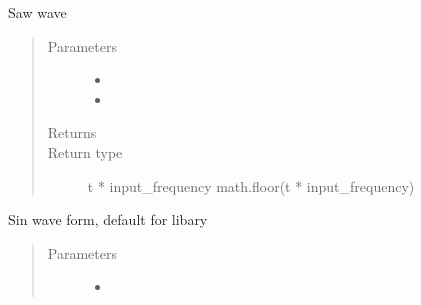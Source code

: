 \documentclass[letterpaper,10pt,english]{sphinxmanual}
\begin{document}
\begin{fulllineitems}
\begin{fulllineitems}
\begin{quote}
\begin{description}
\end{description}\end{quote}

\end{fulllineitems}


\begin{fulllineitems}
\label{\detokenize{dpav:dpav.audio.wave_table.saw}}
\sphinxAtStartPar
Saw wave
\begin{quote}\begin{description}
\item[{Parameters}] \leavevmode\begin{itemize}
\item {} 
\sphinxAtStartPar
{} \textendash{} 

\item {} 
\sphinxAtStartPar
{} \textendash{} 

\end{itemize}

\item[{Returns}] \leavevmode
\sphinxAtStartPar


\item[{Return type}] \leavevmode
\sphinxAtStartPar
t * input\_frequency \sphinxhyphen{} math.floor(t * input\_frequency)

\end{description}\end{quote}

\end{fulllineitems}


\begin{fulllineitems}
\label{\detokenize{dpav:dpav.audio.wave_table.sin}}
\sphinxAtStartPar
Sin wave form, default for libary
\begin{quote}\begin{description}
\item[{Parameters}] \leavevmode\begin{itemize}
\item {} 
\sphinxAtStartPar
{} \textendash{} 


\end{itemize}
\end{description}
\end{quote}
\end{fulllineitems}
\end{fulllineitems}
\end{document}

